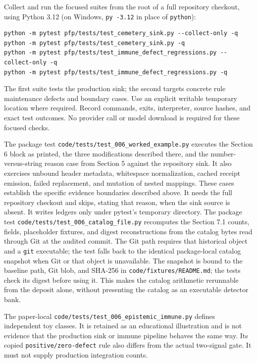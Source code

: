 \documentclass[
  11pt,
]{article}
\newcommand{\passthrough}[1]{#1}
\begin{document}
Collect and run the focused suites from the root of a full repository
checkout, using Python 3.12 (on Windows,
\passthrough{\lstinline!py -3.12!} in place of
\passthrough{\lstinline!python!}):

\begin{lstlisting}
python -m pytest pfp/tests/test_cemetery_sink.py --collect-only -q
python -m pytest pfp/tests/test_cemetery_sink.py -q
python -m pytest pfp/tests/test_immune_defect_regressions.py --collect-only -q
python -m pytest pfp/tests/test_immune_defect_regressions.py -q
\end{lstlisting}

The first suite tests the production sink; the second targets concrete
rule maintenance defects and boundary cases. Use an explicit writable
temporary location where required. Record commands, exits, interpreter,
source hashes, and exact test outcomes. No provider call or model
download is required for these focused checks.

The package test \nolinkurl{code/tests/test_006_worked_example.py}
executes the Section 6 block as printed, the three modifications
described there, and the number-versus-string reason case from Section 5
against the repository sink. It also exercises unbound header metadata,
whitespace normalization, cached receipt emission, failed replacement,
and mutation of nested mappings. These cases establish the specific
evidence boundaries described above. It needs the full repository
checkout and skips, stating that reason, when the sink source is absent.
It writes ledgers only under pytest's temporary directory. The package
test \nolinkurl{code/tests/test_006_catalog_file.py} recomputes the
Section 7.1 counts, fields, placeholder fixtures, and digest
reconstructions from the catalog bytes read through Git at the audited
commit. The Git path requires that historical object and a
\passthrough{\lstinline!git!} executable; the test falls back to the
identical package-local catalog snapshot when Git or that object is
unavailable. The snapshot is bound to the baseline path, Git blob, and
SHA-256 in \nolinkurl{code/fixtures/README.md}; the tests check its
digest before using it. This makes the catalog arithmetic rerunnable
from the deposit alone, without presenting the catalog as an executable
detector bank.

The paper-local \nolinkurl{code/tests/test_006_epistemic_immune.py}
defines independent toy classes. It is retained as an educational
illustration and is not evidence that the production sink or immune
pipeline behaves the same way. Its copied
\nolinkurl{positive/zero-defect} rule also differs from the actual
two-signal gate. It must not supply production integration counts.
\end{document}
